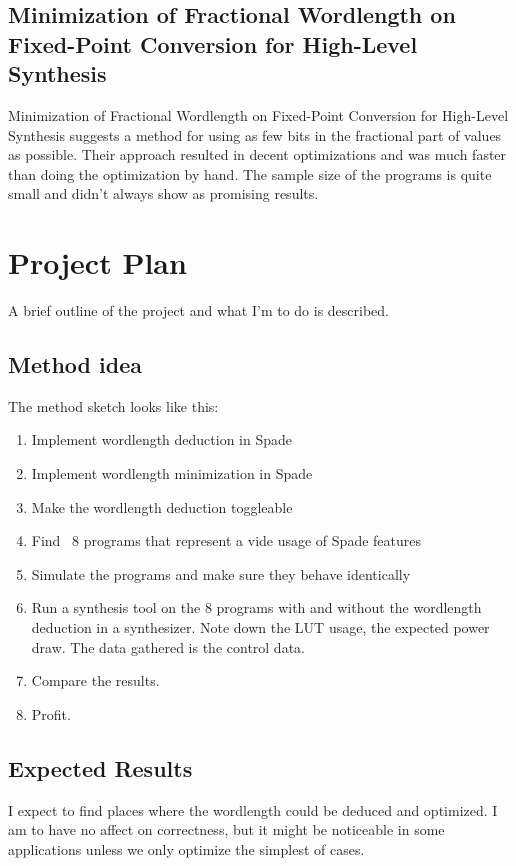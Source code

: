 \documentclass[msc,lith,english]{liuthesis}
\begin{document}
\section{Minimization of Fractional Wordlength on Fixed-Point Conversion for High-Level Synthesis}
Minimization of Fractional Wordlength on Fixed-Point Conversion for High-Level Synthesis suggests a method for using as few bits in the fractional part of values as possible. Their approach resulted in decent optimizations and was much faster than doing the optimization by hand. The sample size of the programs is quite small and didn't always show as promising results.

\cite{src:MinOfFrac}

\chapter{Project Plan}
A brief outline of the project and what I'm to do is described.

\section{Method idea}
The method sketch looks like this:
\begin{enumerate}
  \item Implement wordlength deduction in Spade
  \item Implement wordlength minimization in Spade
  \item Make the wordlength deduction toggleable
  \item Find ~8 programs that represent a vide usage of Spade features
  \item Simulate the programs and make sure they behave identically
  \item Run a synthesis tool on the 8 programs with and without the wordlength deduction in a synthesizer. Note down the LUT usage, the expected power draw. The data gathered is the control data.
  \item Compare the results.
  \item Profit.
\end{enumerate}

\section{Expected Results}
I expect to find places where the wordlength could be deduced and optimized. I am to have no affect on correctness, but it might be noticeable in some applications unless we only optimize the simplest of cases.
\end{document}

